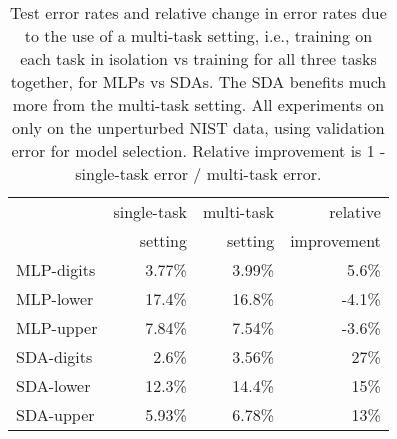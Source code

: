 \documentclass{article} %
\begin{document}
\begin{table}[ht]
\caption{Test error rates and relative change in error rates due to the use of
a multi-task setting, i.e., training on each task in isolation vs training
for all three tasks together, for MLPs vs SDAs. The SDA benefits much
more from the multi-task setting. All experiments on only on the
unperturbed NIST data, using validation error for model selection.
Relative improvement is 1 - single-task error / multi-task error.}
\label{tab:multi-task}
\begin{center}
\begin{tabular}{|l|r|r|r|} \hline
             & single-task  & multi-task  & relative \\ 
             & setting      & setting     & improvement \\ \hline
MLP-digits   &  3.77\%      &  3.99\%     & 5.6\%   \\ \hline 
MLP-lower   &  17.4\%      &  16.8\%     &  -4.1\%    \\ \hline 
MLP-upper   &  7.84\%     &  7.54\%      & -3.6\%    \\ \hline 
SDA-digits   &  2.6\%      &  3.56\%     & 27\%    \\ \hline 
SDA-lower   &  12.3\%      &  14.4\%    & 15\%    \\ \hline 
SDA-upper   &  5.93\%     &  6.78\%      & 13\%    \\ \hline 
\end{tabular}
\end{center}
\end{table}


\newpage

\vspace*{10mm}

%

%
\end{document}
